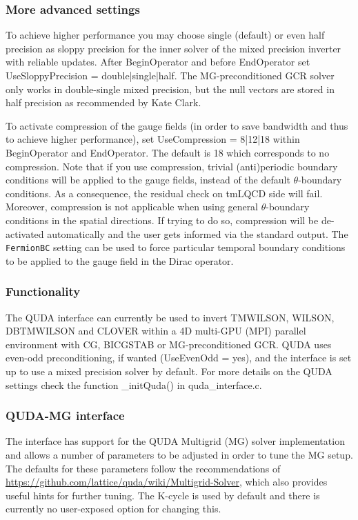 \subsubsection{More advanced settings}
To achieve higher performance you may choose single (default) or even half precision as sloppy precision for the inner solver of the mixed precision inverter with reliable updates. After {\ttfamily BeginOperator} and before {\ttfamily EndOperator} set {\ttfamily UseSloppyPrecision = double|single|half}.
The MG-preconditioned GCR solver only works in double-single mixed precision, but the null vectors are stored in half precision as recommended by Kate Clark.

To activate compression of the gauge fields (in order to save bandwidth and thus to achieve higher performance), set {\ttfamily UseCompression = 8|12|18} within {\ttfamily BeginOperator} and {\ttfamily EndOperator}. 
The default is 18 which corresponds to no compression. 
Note that if you use compression, trivial (anti)periodic boundary conditions will be applied to the gauge fields, instead of the default $\theta$-boundary conditions. 
As a consequence, the residual check on tmLQCD side will fail. 
Moreover, compression is not applicable when using general $\theta$-boundary conditions in the spatial directions. 
If trying to do so, compression will be de-activated automatically and the user gets informed via the standard output.
The \texttt{FermionBC} setting can be used to force particular temporal boundary conditions to be applied to the gauge field in the Dirac operator.

\subsubsection{Functionality}
The QUDA interface can currently be used to invert {\ttfamily TMWILSON, WILSON, DBTMWILSON} and {\ttfamily CLOVER} within a 4D multi-GPU (MPI) parallel environment with CG, BICGSTAB or MG-preconditioned GCR. QUDA uses even-odd preconditioning, if wanted ({\ttfamily UseEvenOdd = yes}), and the interface is set up to use a mixed precision solver by default. For more details on the QUDA settings check the function {\ttfamily \_initQuda()} in {\ttfamily quda\_interface.c}.

\subsubsection{QUDA-MG interface}
The interface has support for the QUDA Multigrid (MG) solver implementation and allows a number of parameters to be adjusted in order to tune the MG setup.
The defaults for these parameters follow the recommendations of \url{https://github.com/lattice/quda/wiki/Multigrid-Solver}, which also provides useful hints for further tuning.
The K-cycle is used by default and there is currently no user-exposed option for changing this.

